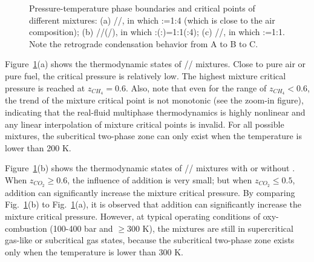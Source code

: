     \begin{figure}[htb]
        \centering



        \caption{Pressure-temperature phase boundaries and critical points of different mixtures: (a) //, in which :=1:4 (which is close to the air composition); (b) //(/), in which :(:)=1:1(:4); (c) //, in which :=1:1. Note the retrograde condensation behavior from A to B to C.}
        \label{v4}
    \end{figure}

Figure~\ref{v4}(a) shows the thermodynamic states of // mixtures. Close to pure air or pure fuel, the critical pressure is relatively low. The highest mixture critical pressure is reached %
at $z_{CH_4}=0.6$. Also, note that even for the range of $z_{CH_4}<0.6$, the trend of the mixture critical point is not monotonic (see the zoom-in figure), indicating that the real-fluid multiphase thermodynamics is highly nonlinear and any linear interpolation of mixture critical points is invalid. For all possible mixtures, the subcritical two-phase zone can only exist when the temperature is lower than 200 K. %

Figure~\ref{v4}(b) shows the thermodynamic states of // mixtures with or without . When $z_{CO_2}\geq0.6$, the influence of  addition is very small; but when $z_{CO_2}\leq0.5$,  addition can significantly increase the mixture critical pressure. By comparing Fig.~\ref{v4}(b) to Fig.~\ref{v4}(a), it is observed that  addition can significantly increase the mixture critical pressure. However, at typical operating conditions of  oxy-combustion (100-400 bar and $\ge300$ K), the mixtures are still in supercritical gas-like or subcritical gas states, because the subcritical two-phase zone exists only when the temperature is lower than 300 K.

